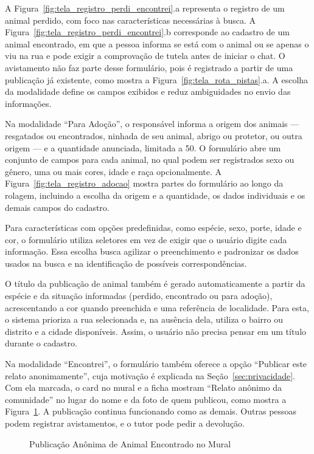 A Figura~\ref{fig:tela_registro_perdi_encontrei}.a representa o registro de um animal perdido, com foco nas características necessárias à busca. A Figura~\ref{fig:tela_registro_perdi_encontrei}.b corresponde ao cadastro de um animal encontrado, em que a pessoa informa se está com o animal ou se apenas o viu na rua e pode exigir a comprovação de tutela antes de iniciar o chat. O avistamento não faz parte desse formulário, pois é registrado a partir de uma publicação já existente, como mostra a Figura~\ref{fig:tela_rota_pistas}.a. A escolha da modalidade define os campos exibidos e reduz ambiguidades no envio das informações.

Na modalidade ``Para Adoção'', o responsável informa a origem dos animais — resgatados ou encontrados, ninhada de seu animal, abrigo ou protetor, ou outra origem — e a quantidade anunciada, limitada a 50. O formulário abre um conjunto de campos para cada animal, no qual podem ser registrados sexo ou gênero, uma ou mais cores, idade e raça opcionalmente. A Figura~\ref{fig:tela_registro_adocao} mostra partes do formulário ao longo da rolagem, incluindo a escolha da origem e a quantidade, os dados individuais e os demais campos do cadastro.

Para características com opções predefinidas, como espécie, sexo, porte, idade e cor, o formulário utiliza seletores em vez de exigir que o usuário digite cada informação. Essa escolha busca agilizar o preenchimento e padronizar os dados usados na busca e na identificação de possíveis correspondências.

O título da publicação de animal também é gerado automaticamente a partir da espécie e da situação informadas (perdido, encontrado ou para adoção), acrescentando a cor quando preenchida e uma referência de localidade. Para esta, o sistema prioriza a rua selecionada e, na ausência dela, utiliza o bairro ou distrito e a cidade disponíveis. Assim, o usuário não precisa pensar em um título durante o cadastro.

Na modalidade ``Encontrei'', o formulário também oferece a opção ``Publicar este relato anonimamente'', cuja motivação é explicada na Seção~\ref{sec:privacidade}. Com ela marcada, o card no mural e a ficha mostram ``Relato anônimo da comunidade'' no lugar do nome e da foto de quem publicou, como mostra a Figura~\ref{fig:tela_publicacao_anonima}. A publicação continua funcionando como as demais. Outras pessoas podem registrar avistamentos, e o tutor pode pedir a devolução.

\begin{figure}[H]
    \centering
    \caption{Publicação Anônima de Animal Encontrado no Mural}
    \label{fig:tela_publicacao_anonima}
\end{figure}


